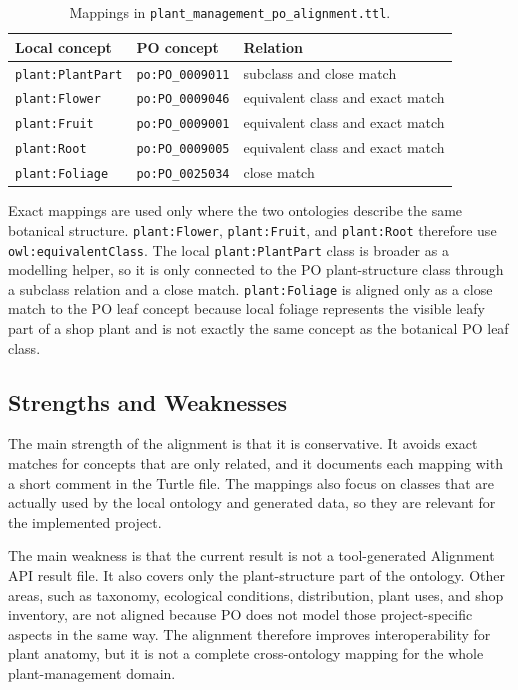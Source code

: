 \documentclass[11pt,a4paper]{article}
\newcommand{\artifact}[1]{\texttt{#1}}
\begin{document}
\begin{table}[h]
\centering
\begin{tabular}{lll}
\toprule
Local concept & PO concept & Relation \\
\midrule
\artifact{plant:PlantPart} & \artifact{po:PO\_0009011} & subclass and close match \\
\artifact{plant:Flower} & \artifact{po:PO\_0009046} & equivalent class and exact match \\
\artifact{plant:Fruit} & \artifact{po:PO\_0009001} & equivalent class and exact match \\
\artifact{plant:Root} & \artifact{po:PO\_0009005} & equivalent class and exact match \\
\artifact{plant:Foliage} & \artifact{po:PO\_0025034} & close match \\
\bottomrule
\end{tabular}
\caption{Mappings in \artifact{plant\_management\_po\_alignment.ttl}.}
\label{tab:po-alignment}
\end{table}

Exact mappings are used only where the two ontologies describe the same
botanical structure. \artifact{plant:Flower}, \artifact{plant:Fruit}, and
\artifact{plant:Root} therefore use \artifact{owl:equivalentClass}. The local
\artifact{plant:PlantPart} class is broader as a modelling helper, so it is only
connected to the PO plant-structure class through a subclass relation and a
close match. \artifact{plant:Foliage} is aligned only as a close match to the PO
leaf concept because local foliage represents the visible leafy part of a shop
plant and is not exactly the same concept as the botanical PO leaf class.

\subsection{Strengths and Weaknesses}

The main strength of the alignment is that it is conservative. It avoids exact
matches for concepts that are only related, and it documents each mapping with a
short comment in the Turtle file. The mappings also focus on classes that are
actually used by the local ontology and generated data, so they are relevant for
the implemented project.

The main weakness is that the current result is not a tool-generated
Alignment API result file. It also covers only the plant-structure part of the
ontology. Other areas, such as taxonomy, ecological conditions, distribution,
plant uses, and shop inventory, are not aligned because PO does not model those
project-specific aspects in the same way. The alignment therefore improves
interoperability for plant anatomy, but it is not a complete cross-ontology
mapping for the whole plant-management domain.
\end{document}
